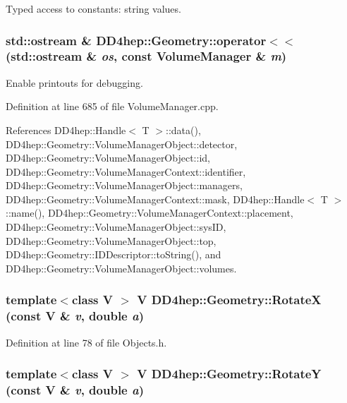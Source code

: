 Typed access to constants: string values. \hypertarget{namespace_d_d4hep_1_1_geometry_a3e162786678e79867327c71e9699ac71}{
\subsubsection[{operator$<$$<$}]{\setlength{\rightskip}{0pt plus 5cm}std::ostream \& DD4hep::Geometry::operator$<$$<$ (std::ostream \& {\em os}, \/  const {\bf VolumeManager} \& {\em m})}}
\label{namespace_d_d4hep_1_1_geometry_a3e162786678e79867327c71e9699ac71}


Enable printouts for debugging. 

Definition at line 685 of file VolumeManager.cpp.

References DD4hep::Handle$<$ T $>$::data(), DD4hep::Geometry::VolumeManagerObject::detector, DD4hep::Geometry::VolumeManagerObject::id, DD4hep::Geometry::VolumeManagerContext::identifier, DD4hep::Geometry::VolumeManagerObject::managers, DD4hep::Geometry::VolumeManagerContext::mask, DD4hep::Handle$<$ T $>$::name(), DD4hep::Geometry::VolumeManagerContext::placement, DD4hep::Geometry::VolumeManagerObject::sysID, DD4hep::Geometry::VolumeManagerObject::top, DD4hep::Geometry::IDDescriptor::toString(), and DD4hep::Geometry::VolumeManagerObject::volumes.\hypertarget{namespace_d_d4hep_1_1_geometry_ab9a1ffea2a77a54efcc6568d626f81de}{
\subsubsection[{RotateX}]{\setlength{\rightskip}{0pt plus 5cm}template$<$class V $>$ V DD4hep::Geometry::RotateX (const V \& {\em v}, \/  double {\em a})}}
\label{namespace_d_d4hep_1_1_geometry_ab9a1ffea2a77a54efcc6568d626f81de}


Definition at line 78 of file Objects.h.\hypertarget{namespace_d_d4hep_1_1_geometry_a675b466e6e9a3c67f53dd7d23f5540ab}{
\subsubsection[{RotateY}]{\setlength{\rightskip}{0pt plus 5cm}template$<$class V $>$ V DD4hep::Geometry::RotateY (const V \& {\em v}, \/  double {\em a})}}
\label{namespace_d_d4hep_1_1_geometry_a675b466e6e9a3c67f53dd7d23f5540ab}


